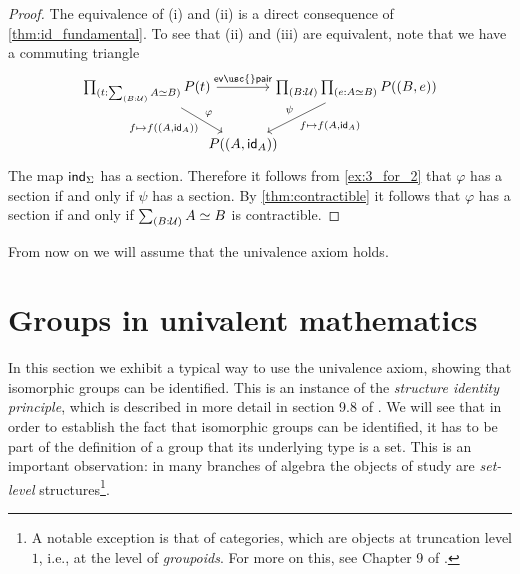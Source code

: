 \begin{proof}
The equivalence of (i) and (ii) is a direct consequence of \cref{thm:id_fundamental}. 
To see that (ii) and (iii) are equivalent, note that we have a commuting triangle
\begin{equation*}
\begin{tikzcd}[column sep=-1em]
\prd{t:\sm{B:\UU}\eqv{A}{B}}P(t) \arrow[rr,"\mathsf{ev\usc{}pair}"] \arrow[dr,"\varphi","{f\mapsto f((A,\idfunc[A]))}"'] & & \prd{B:\UU}{e:\eqv{A}{B}} P((B,e)) \arrow[dl,"{f\mapsto f(A,\idfunc[A])}","\psi"'] \\
& P((A,\idfunc[A]))
\end{tikzcd}
\end{equation*}
The map $\mathsf{ind}_{\Sigma}$ has a section. Therefore it follows from \cref{ex:3_for_2} that $\varphi$ has a section if and only if $\psi$ has a section. By \cref{thm:contractible} it follows that $\varphi$ has a section if and only if $\sm{B:\UU}\eqv{A}{B}$ is contractible. 
\end{proof}

From now on we will assume that the univalence axiom holds.

\section{Groups in univalent mathematics}

In this section we exhibit a typical way to use the univalence axiom, showing that isomorphic groups can be identified.
This is an instance of the \emph{structure identity principle}, which is described in more detail in section 9.8 of \cite{hottbook}.
We will see that in order to establish the fact that isomorphic groups can be identified, it has to be part of the definition of a group that its underlying type is a set. This is an important observation: in many branches of algebra the objects of study are \emph{set-level} structures\footnote{A notable exception is that of categories, which are objects at truncation level $1$, i.e., at the level of \emph{groupoids}. For more on this, see Chapter 9 of \cite{hottbook}.}.

